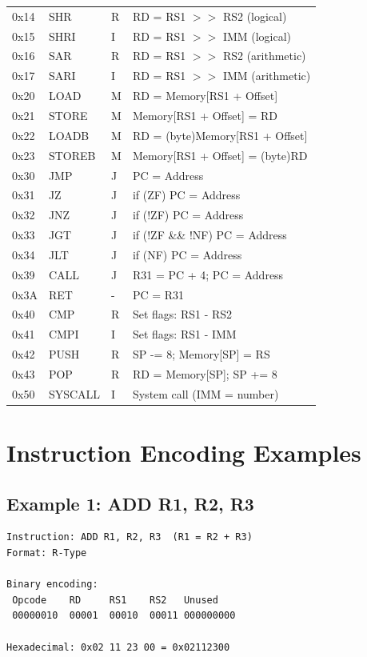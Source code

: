 \documentclass[12pt,a4paper,oneside]{book}
\begin{document}
\begin{table}[H]
\begin{tabularx}{\textwidth}{|l|l|l|X|}
0x14 & SHR & R & RD = RS1 $>>$ RS2 (logical) \\
0x15 & SHRI & I & RD = RS1 $>>$ IMM (logical) \\
0x16 & SAR & R & RD = RS1 $>>$ RS2 (arithmetic) \\
0x17 & SARI & I & RD = RS1 $>>$ IMM (arithmetic) \\
\hline
0x20 & LOAD & M & RD = Memory[RS1 + Offset] \\
0x21 & STORE & M & Memory[RS1 + Offset] = RD \\
0x22 & LOADB & M & RD = (byte)Memory[RS1 + Offset] \\
0x23 & STOREB & M & Memory[RS1 + Offset] = (byte)RD \\
\hline
0x30 & JMP & J & PC = Address \\
0x31 & JZ & J & if (ZF) PC = Address \\
0x32 & JNZ & J & if (!ZF) PC = Address \\
0x33 & JGT & J & if (!ZF \&\& !NF) PC = Address \\
0x34 & JLT & J & if (NF) PC = Address \\
0x39 & CALL & J & R31 = PC + 4; PC = Address \\
0x3A & RET & - & PC = R31 \\
\hline
0x40 & CMP & R & Set flags: RS1 - RS2 \\
0x41 & CMPI & I & Set flags: RS1 - IMM \\
0x42 & PUSH & R & SP -= 8; Memory[SP] = RS \\
0x43 & POP & R & RD = Memory[SP]; SP += 8 \\
\hline
0x50 & SYSCALL & I & System call (IMM = number) \\
\hline
\end{tabularx}
\end{table}

\section{Instruction Encoding Examples}

\subsection{Example 1: ADD R1, R2, R3}

\begin{verbatim}
Instruction: ADD R1, R2, R3  (R1 = R2 + R3)
Format: R-Type

Binary encoding:
 Opcode    RD     RS1    RS2   Unused
 00000010  00001  00010  00011 000000000
 
Hexadecimal: 0x02 11 23 00 = 0x02112300
\end{verbatim}
\end{document}

